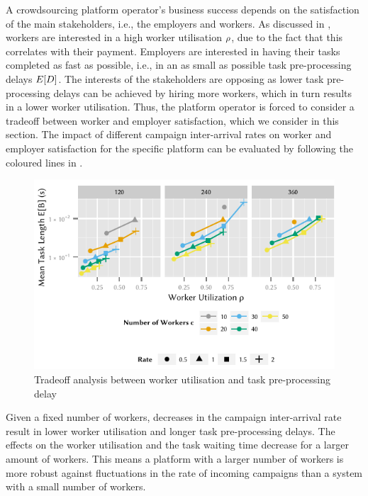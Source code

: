 A crowdsourcing platform operator's business success depends on the satisfaction of the main stakeholders, i.e., the employers and workers.
As discussed in , workers are interested in a high worker utilisation \(\rho\), due to the fact that this correlates with their payment.
Employers are interested in having their tasks completed as fast as possible, i.e., in an as small as possible task pre-processing delays \(E[D]\).
The interests of the stakeholders are opposing as lower task pre-processing delays can be achieved by hiring more workers, which in turn results in a lower worker utilisation.
Thus, the platform operator is forced to consider a tradeoff between worker and employer satisfaction, which we consider in this section.
The impact of different campaign inter-arrival rates on worker and employer satisfaction for the specific platform can be evaluated by following the coloured lines in .

\begin{figure}
	\centering
	\includegraphics{cloud/crowdsourcing/numerical_evaluation/figures/pareto}
	\caption{Tradeoff analysis between worker utilisation and task pre-processing delay}
	\label{fig:cloud:crowdsourcing:performance_evaluation:tradeoff:pareto}
\end{figure}

Given a fixed number of workers, decreases in the campaign inter-arrival rate result in lower worker utilisation and longer task pre-processing delays.
The effects on the worker utilisation and the task waiting time decrease for a larger amount of workers.
This means a platform with a larger number of workers is more robust against fluctuations in the rate of incoming campaigns than a system with a small number of workers.

